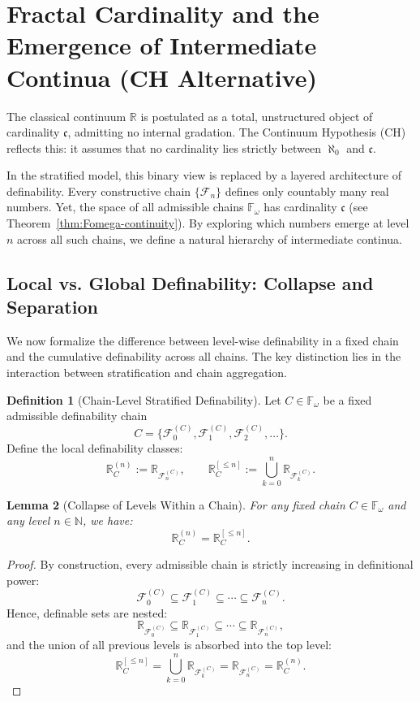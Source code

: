 \documentclass[12pt]{article}
\theoremstyle{definition}
\newtheorem{definition}{Definition}[section]
\theoremstyle{plain}
\newtheorem{lemma}[definition]{Lemma}
\theoremstyle{remark}
\begin{document}
\section{Fractal Cardinality and the Emergence of Intermediate Continua (CH Alternative)}

The classical continuum \( \mathbb{R} \) is postulated as a total, unstructured object of cardinality \( \mathfrak{c} \), admitting no internal gradation. The Continuum Hypothesis (CH) reflects this: it assumes that no cardinality lies strictly between \( \aleph_0 \) and \( \mathfrak{c} \).

In the stratified model, this binary view is replaced by a layered architecture of definability. Every constructive chain \( \{ \mathcal{F}_n \} \) defines only countably many real numbers. Yet, the space of all admissible chains \( \mathbb{F}_\omega \) has cardinality \( \mathfrak{c} \) (see Theorem~\ref{thm:Fomega-continuity}). By exploring which numbers emerge at level \( n \) across all such chains, we define a natural hierarchy of intermediate continua.

\subsection*{Local vs. Global Definability: Collapse and Separation}

We now formalize the difference between level-wise definability in a fixed chain and the cumulative definability across all chains. The key distinction lies in the interaction between stratification and chain aggregation.

\begin{definition}[Chain-Level Stratified Definability]
Let \( C \in \mathbb{F}_\omega \) be a fixed admissible definability chain
\[
    C = \{ \mathcal{F}_0^{(C)}, \mathcal{F}_1^{(C)}, \mathcal{F}_2^{(C)}, \ldots \}.
\]
Define the local definability classes:
\[
    \mathbb{R}_C^{(n)} := \mathbb{R}_{\mathcal{F}_n^{(C)}}, \qquad
    \mathbb{R}_C^{[\leq n]} := \bigcup_{k=0}^{n} \mathbb{R}_{\mathcal{F}_k^{(C)}}.
\]
\end{definition}

\begin{lemma}[Collapse of Levels Within a Chain]
\label{lemma:collapse}
For any fixed chain \( C \in \mathbb{F}_\omega \) and any level \( n \in \mathbb{N} \), we have:
\[
    \mathbb{R}_C^{(n)} = \mathbb{R}_C^{[\leq n]}.
\]
\end{lemma}

\begin{proof}
By construction, every admissible chain is strictly increasing in definitional power:
\[
    \mathcal{F}_0^{(C)} \subseteq \mathcal{F}_1^{(C)} \subseteq \cdots \subseteq \mathcal{F}_n^{(C)}.
\]
Hence, definable sets are nested:
\[
    \mathbb{R}_{\mathcal{F}_0^{(C)}} \subseteq \mathbb{R}_{\mathcal{F}_1^{(C)}} \subseteq \cdots \subseteq \mathbb{R}_{\mathcal{F}_n^{(C)}},
\]
and the union of all previous levels is absorbed into the top level:
\[
    \mathbb{R}_C^{[\leq n]} = \bigcup_{k=0}^{n} \mathbb{R}_{\mathcal{F}_k^{(C)}} = \mathbb{R}_{\mathcal{F}_n^{(C)}} = \mathbb{R}_C^{(n)}.
\]
\end{proof}
\end{document}
